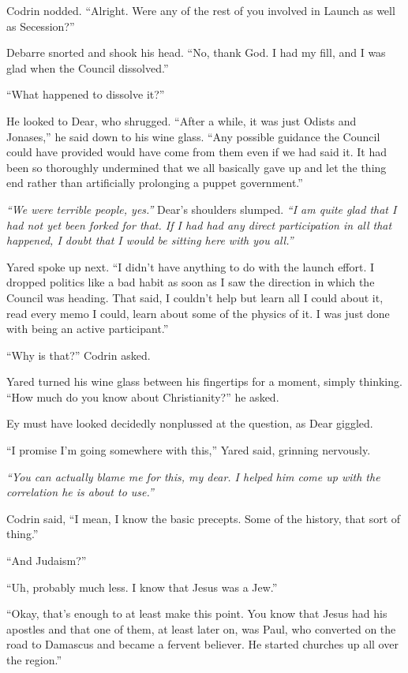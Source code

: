 Codrin nodded. ``Alright. Were any of the rest of you involved in Launch as well as Secession?''

Debarre snorted and shook his head. ``No, thank God. I had my fill, and I was glad when the Council dissolved.''

``What happened to dissolve it?''

He looked to Dear, who shrugged. ``After a while, it was just Odists and Jonases,'' he said down to his wine glass. ``Any possible guidance the Council could have provided would have come from them even if we had said it. It had been so thoroughly undermined that we all basically gave up and let the thing end rather than artificially prolonging a puppet government.''

\emph{``We were terrible people, yes.''} Dear's shoulders slumped. \emph{``I am quite glad that I had not yet been forked for that. If I had had any direct participation in all that happened, I doubt that I would be sitting here with you all.''}

Yared spoke up next. ``I didn't have anything to do with the launch effort. I dropped politics like a bad habit as soon as I saw the direction in which the Council was heading. That said, I couldn't help but learn all I could about it, read every memo I could, learn about some of the physics of it. I was just done with being an active participant.''

``Why is that?'' Codrin asked.

Yared turned his wine glass between his fingertips for a moment, simply thinking. ``How much do you know about Christianity?'' he asked.

Ey must have looked decidedly nonplussed at the question, as Dear giggled.

``I promise I'm going somewhere with this,'' Yared said, grinning nervously.

\emph{``You can actually blame me for this, my dear. I helped him come up with the correlation he is about to use.''}

Codrin said, ``I mean, I know the basic precepts. Some of the history, that sort of thing.''

``And Judaism?''

``Uh, probably much less. I know that Jesus was a Jew.''

``Okay, that's enough to at least make this point. You know that Jesus had his apostles and that one of them, at least later on, was Paul, who converted on the road to Damascus and became a fervent believer. He started churches up all over the region.''

